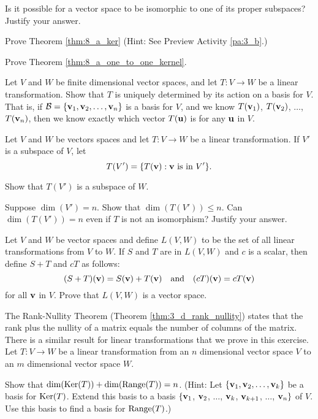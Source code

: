 	
\item  Is it possible for a vector space to be isomorphic to one of its proper subspaces?  Justify your answer.

\item Prove Theorem \ref{thm:8_a_ker} (Hint: See Preview Activity \ref{pa:3_b}.) 

\item Prove Theorem \ref{thm:8_a_one_to_one_kernel}. 

\item Let $V$ and $W$ be finite dimensional vector spaces, and let $T : V \to W$ be a linear transformation. Show that $T$ is uniquely determined by its action on a basis for $V$. That is, if $\mathcal{B} = \{\mathbf{v}_1, \mathbf{v}_2, \ldots, \mathbf{v}_n\}$ is a basis for $V$, and we know $T(\mathbf{v}_1)$, $T(\mathbf{v}_2)$, $\ldots$, $T(\mathbf{v}_n)$, then we know exactly which vector $T(\mathbf{u})$ is for any $\mathbf{u}$ in $V$. 

\item Let $V$ and $W$ be vectors spaces and let $T: V \to W$ be a linear transformation. If $V'$ is a subspace of $V$, let 
\[T(V') = \{T(\mathbf{v}) : \mathbf{v} \text{ is in } V'\}.\]
	\ba
	\item Show that $T(V')$ is a subspace of $W$. 
	\item Suppose $\dim(V') = n$. Show that $\dim(T(V')) \leq n$. Can  $\dim(T(V')) = n$ even if $T$ is not an isomorphism? Justify your answer. 
	\ea



\item \label{ex:8_a_transformation_space} Let $V$ and $W$ be vector spaces and define $L(V,W)$ to be the set of all linear transformations from $V$ to $W$. If $S$ and $T$ are in $L(V,W)$ and $c$ is a scalar,  then define $S+T$ and $cT$ as follows:
\[(S+T)(\vv) = S(\vv) + T(\vv) \ \ \text{ and } \ \ (cT)(\vv) = cT(\vv)\]
for all $\mathbf{v}$ in $V$. Prove that $L(V,W)$ is a vector space. 
 
\item \label{ex:8_a_rank_nullity} The Rank-Nullity Theorem (Theorem \ref{thm:3_d_rank_nullity}) states that the rank plus the nullity of a matrix equals the number of columns of the matrix. There is a similar result for linear transformations that we prove in this exercise. Let $T : V \to W$ be a linear transformation from an $n$ dimensional vector space $V$ to an $m$ dimensional vector space $W$. 

Show that $\dim(\text{Ker}(T)) + \dim(\text{Range}(T)) = n$. (Hint: Let $\{\mathbf{v}_1, \mathbf{v}_2, \ldots, \mathbf{v}_k\}$ be a basis for $\text{Ker}(T)$. Extend this basis to a basis $\{\mathbf{v}_1$, $\mathbf{v}_2$, $\ldots$, $\mathbf{v}_k$, $\mathbf{v}_{k+1}$, $\ldots$, $\mathbf{v}_n\}$ of $V$. Use this basis to find a basis for $\text{Range}(T)$.) 
	 
